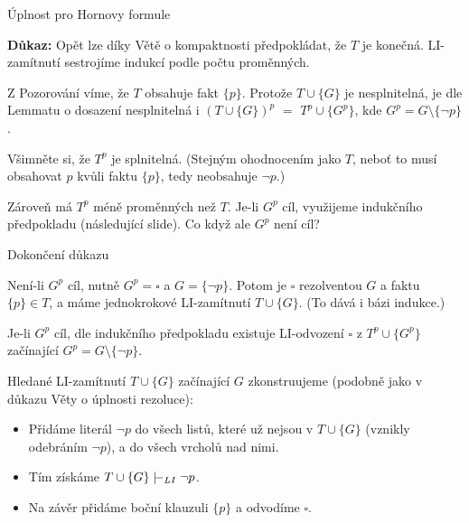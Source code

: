\documentclass{beamer}
\begin{document}
\begin{frame}{Úplnost pro Hornovy formule}
 

    \textbf{Důkaz:} Opět lze díky Větě o kompaktnosti předpokládat, že $T$ je konečná. LI-zamítnutí sestrojíme indukcí podle počtu proměnných.

    Z Pozorování víme, že $T$ obsahuje fakt $\{p\}$. Protože $T\cup\{G\}$ je nesplnitelná, je dle Lemmatu o dosazení \alert{nesplnitelná i} $(T\cup\{G\})^p$ $=$ \alert{$T^p\cup\{G^p\}$}, kde $G^p=G\setminus\{\neg p\}$.
    
    Všimněte si, že \alert{$T^p$ je splnitelná}. (Stejným ohodnocením jako $T$, neboť to musí obsahovat $p$ kvůli faktu $\{p\}$, tedy neobsahuje $\neg p$.) 
    
    Zároveň má $T^p$ méně proměnných než $T$. \alert{Je-li $G^p$ cíl}, využijeme indukčního předpokladu (následující slide). Co když ale $G^p$ není cíl?       
    
\end{frame}


\begin{frame}{Dokončení důkazu}

    \alert{Není-li $G^p$ cíl}, nutně $G^p=\square$ a $G=\{\neg p\}$. Potom je $\square$ rezolventou $G$ a faktu $\{p\}\in T$, a máme jednokrokové LI-zamítnutí $T\cup\{G\}$. (To dává i \alert{bázi indukce}.)


    \alert{Je-li $G^p$ cíl}, dle \alert{indukčního předpokladu} existuje LI-odvození $\square$ z $T^p\cup\{G^p\}$ začínající $G^p=G\setminus\{\neg p\}$.
    
    Hledané LI-zamítnutí $T\cup\{G\}$ začínající $G$ zkonstruujeme (podobně jako v důkazu Věty o úplnosti rezoluce):

    \begin{itemize}
        \item Přidáme literál $\neg p$ do všech listů, které už nejsou v $T\cup\{G\}$ (vznikly odebráním $\neg p$), a do všech vrcholů nad nimi.
        \item Tím získáme $T\cup\{G\}\proves_{LI}\neg p$.
        \item Na závěr přidáme boční klauzuli $\{p\}$ a odvodíme $\square$.\hfill\qedsymbol
    \end{itemize}

\end{frame}
\end{document}
